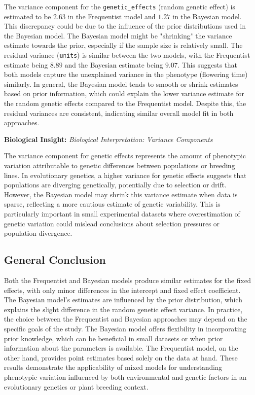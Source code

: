 \documentclass[12pt,a4paper]{article}
\newenvironment{biologicalinsightbox}[1][]
{\begin{basebox}[linecolor=uqpurple]
\textbf{\color{uqpurple}Biological Insight:} \textit{#1}\par\noindent\ignorespaces}
{\end{basebox}}
\begin{document}
The variance component for the \texttt{genetic\_effects} (random genetic effect) is estimated to be \(2.63\) in the Frequentist model and \(1.27\) in the Bayesian model. This discrepancy could be due to the influence of the prior distributions used in the Bayesian model. The Bayesian model might be "shrinking" the variance estimate towards the prior, especially if the sample size is relatively small. The residual variance (\texttt{units}) is similar between the two models, with the Frequentist estimate being \(8.89\) and the Bayesian estimate being \(9.07\). This suggests that both models capture the unexplained variance in the phenotype (flowering time) similarly. In general, the Bayesian model tends to smooth or shrink estimates based on prior information, which could explain the lower variance estimate for the random genetic effects compared to the Frequentist model. Despite this, the residual variances are consistent, indicating similar overall model fit in both approaches.

\begin{biologicalinsightbox}[Biological Interpretation: Variance Components]
The variance component for genetic effects represents the amount of phenotypic variation attributable to genetic differences between populations or breeding lines. In evolutionary genetics, a higher variance for genetic effects suggests that populations are diverging genetically, potentially due to selection or drift. However, the Bayesian model may shrink this variance estimate when data is sparse, reflecting a more cautious estimate of genetic variability. This is particularly important in small experimental datasets where overestimation of genetic variation could mislead conclusions about selection pressures or population divergence.
\end{biologicalinsightbox}


\subsection{General Conclusion}

Both the Frequentist and Bayesian models produce similar estimates for the fixed effects, with only minor differences in the intercept and fixed effect coefficient. The Bayesian model's estimates are influenced by the prior distribution, which explains the slight difference in the random genetic effect variance. In practice, the choice between the Frequentist and Bayesian approaches may depend on the specific goals of the study. The Bayesian model offers flexibility in incorporating prior knowledge, which can be beneficial in small datasets or when prior information about the parameters is available. The Frequentist model, on the other hand, provides point estimates based solely on the data at hand. These results demonstrate the applicability of mixed models for understanding phenotypic variation influenced by both environmental and genetic factors in an evolutionary genetics or plant breeding context.
\end{document}
